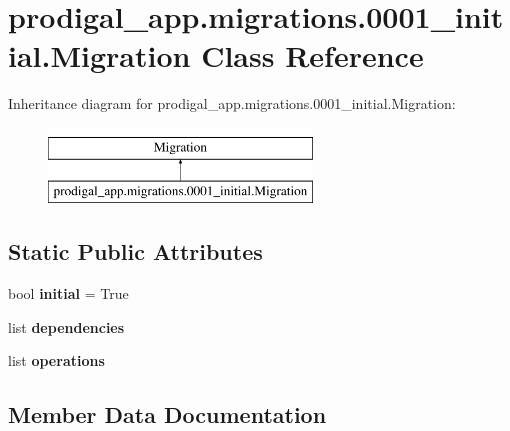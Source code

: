 \hypertarget{classprodigal__app_1_1migrations_1_10001__initial_1_1_migration}{}\section{prodigal\+\_\+app.\+migrations.0001\+\_\+initial.Migration Class Reference}
\label{classprodigal__app_1_1migrations_1_10001__initial_1_1_migration}
Inheritance diagram for prodigal\+\_\+app.\+migrations.0001\+\_\+initial.Migration\+:\begin{figure}[H]
\begin{center}
\leavevmode
\includegraphics[height=2.000000cm]{classprodigal__app_1_1migrations_1_10001__initial_1_1_migration}
\end{center}
\end{figure}
\subsection*{Static Public Attributes}
\begin{DoxyCompactItemize}
\item 
\mbox{\label{classprodigal__app_1_1migrations_1_10001__initial_1_1_migration_a4889bbf8d29560e6c88ef29d7e16bcdb}} 
bool {\bfseries initial} = True
\item 
list {\bfseries dependencies}
\item 
\mbox{\label{classprodigal__app_1_1migrations_1_10001__initial_1_1_migration_ae50d6fac64fe1e04022dd3ce50d807c1}} 
list {\bfseries operations}
\end{DoxyCompactItemize}


\subsection{Member Data Documentation}
\mbox{\label{classprodigal__app_1_1migrations_1_10001__initial_1_1_migration_ad1cf3dc16bfcb5192c29a0b34f2d18ad}} 
